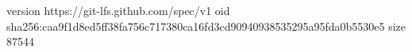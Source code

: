 version https://git-lfs.github.com/spec/v1
oid sha256:caa9f1d8ed5ff38fa756c717380ca16fd3cd90940938535295a95fda0b5530e5
size 87544
